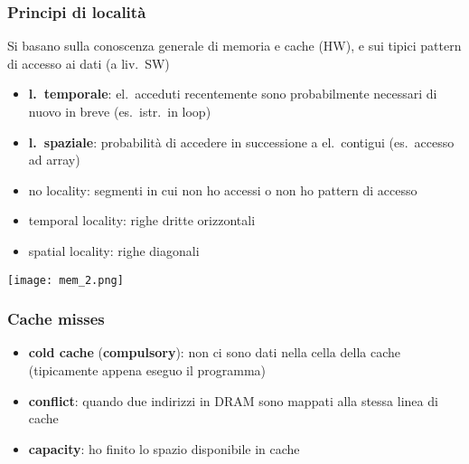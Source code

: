 \subsubsection{Principi di localit\`a}

Si basano sulla conoscenza generale di memoria e cache (HW), e sui tipici pattern di accesso ai dati (a liv.~SW)

\begin{itemize}
  \item \textbf{l.~temporale}: el.~acceduti recentemente sono probabilmente necessari di nuovo in breve (es.~istr.~in loop)
  \item \textbf{l.~spaziale}: probabilit\`a di accedere in successione a el.~contigui (es.~accesso ad array)
\end{itemize}
\begin{example}[frametitle={Visualizzazione grafica delle localit\`a}]
 
  \noindent\begin{minipage}[c]{.5\textwidth}
  \begin{itemize}
    \item no locality: segmenti in cui non ho accessi o non ho pattern di accesso
    \item temporal locality: righe dritte orizzontali
    \item spatial locality: righe diagonali
  \end{itemize}
  \end{minipage}
  \hfill
  \begin{minipage}[c]{.5\textwidth}
  \texttt{[image: mem\_2.png]}
  \end{minipage}
\end{example}

\subsubsection{Cache misses}

\begin{itemize}
  \item \textbf{cold cache} (\textbf{compulsory}): non ci sono dati nella cella della cache (tipicamente appena eseguo il programma)
  \item \textbf{conflict}: quando due indirizzi in DRAM sono mappati alla stessa linea di cache
  \item \textbf{capacity}: ho finito lo spazio disponibile in cache
\end{itemize}

